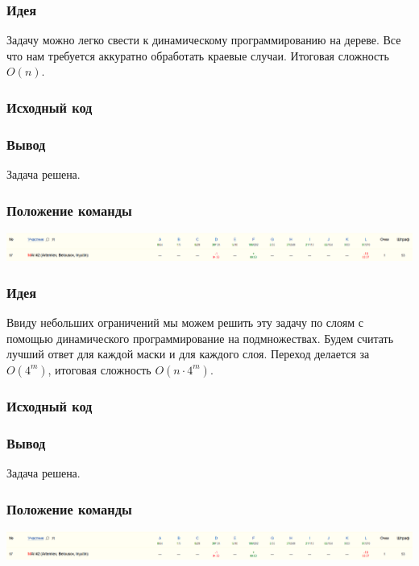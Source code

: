 \subsubsection*{Идея}
Задачу можно легко свести к динамическому программированию на дереве. Все что нам требуется аккуратно обработать краевые случаи. Итоговая сложность $O(n)$.
\subsubsection*{Исходный код}

\subsubsection*{Вывод}
Задача решена.
\subsubsection*{Положение команды}
\includegraphics[scale=0.25]{images/220203.png}\newline\noindent
\pagebreak


\subsubsection*{Идея}
Ввиду небольших ограничений мы можем решить эту задачу по слоям с помощью динамического программирование на подмножествах. Будем считать лучший ответ для каждой маски и для каждого слоя. Переход делается за $O(4^m)$, итоговая сложность $O(n \cdot 4^m)$.
\subsubsection*{Исходный код}

\subsubsection*{Вывод}
Задача решена.
\subsubsection*{Положение команды}
\includegraphics[scale=0.25]{images/220203.png}\newline\noindent
\pagebreak

